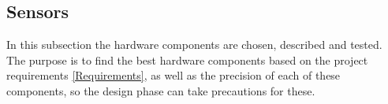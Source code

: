 \subsection{Sensors}
In this subsection the hardware components are chosen, described and tested. The purpose is to find the best hardware components based on the project requirements \ref{Requirements}, as well as the precision of each of these components, so the design phase can take precautions for these. 







